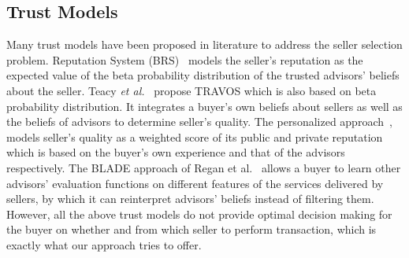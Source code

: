 \documentclass{aamas2014}
\begin{document}
\subsection{Trust Models}
Many trust models have been proposed in literature to address the seller selection problem. Reputation System (BRS)~\cite{whitby05} models the seller's reputation as the expected value of the beta probability distribution of the trusted advisors' beliefs about the seller. Teacy \emph{et al.}~\cite{teach06} propose TRAVOS which is also based on beta probability distribution. It integrates a buyer's own beliefs about sellers as well as the beliefs of advisors to determine seller's quality. The personalized approach~\cite{zhang08}, models seller's quality as a weighted score of its public and private reputation which is based on the buyer's own experience and that of the advisors respectively. The BLADE approach of Regan et al.~\cite{regan2006bayesian} allows a buyer to learn other advisors' evaluation functions on different features of the services delivered by sellers, by which it can reinterpret advisors' beliefs instead of filtering them. However, all the above trust models do not provide optimal decision making for the buyer on whether and from which seller to perform transaction, which is exactly what our approach tries to offer.
\end{document}
